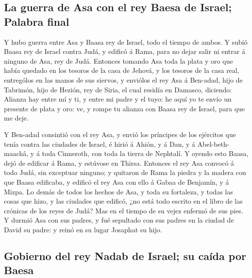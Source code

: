 \hypertarget{la-guerra-de-asa-con-el-rey-baesa-de-israel-palabra-final}{%
\subsection{La guerra de Asa con el rey Baesa de Israel; Palabra
final}\label{la-guerra-de-asa-con-el-rey-baesa-de-israel-palabra-final}}

 Y hubo guerra entre Asa y Baasa rey de Israel, todo el
tiempo de ambos.  Y subió Baasa rey de Israel contra
Judá, y edificó á Rama, para no dejar salir ni entrar á ninguno de Asa,
rey de Judá.  Entonces tomando Asa toda la plata y oro
que había quedado en los tesoros de la casa de Jehová, y los tesoros de
la casa real, entrególos en las manos de sus siervos, y enviólos el rey
Asa á Ben-adad, hijo de Tabrimón, hijo de Hezión, rey de Siria, el cual
residía en Damasco, diciendo:  Alianza hay entre mí y ti,
y entre mi padre y el tuyo: he aquí yo te envío un presente de plata y
oro: ve, y rompe tu alianza con Baasa rey de Israel, para que me deje.

 Y Ben-adad consintió con el rey Asa, y envió los
príncipes de los ejércitos que tenía contra las ciudades de Israel, é
hirió á Ahión, y á Dan, y á Abel-beth-maachâ, y á toda Cinneroth, con
toda la tierra de Nephtalí.  Y oyendo esto Baasa, dejó de
edificar á Rama, y estúvose en Thirsa.  Entonces el rey
Asa convocó á todo Judá, sin exceptuar ninguno; y quitaron de Rama la
piedra y la madera con que Baasa edificaba, y edificó el rey Asa con
ello á Gabaa de Benjamín, y á Mizpa.  Lo demás de todos
los hechos de Asa, y toda su fortaleza, y todas las cosas que hizo, y
las ciudades que edificó, ¿no está todo escrito en el libro de las
crónicas de los reyes de Judá? Mas en el tiempo de su vejez enfermó de
sus pies.  Y durmió Asa con sus padres, y fué sepultado
con sus padres en la ciudad de David su padre: y reinó en su lugar
Josaphat su hijo.

\hypertarget{gobierno-del-rey-nadab-de-israel-su-cauxedda-por-baesa}{%
\subsection{Gobierno del rey Nadab de Israel; su caída por
Baesa}\label{gobierno-del-rey-nadab-de-israel-su-cauxedda-por-baesa}}

